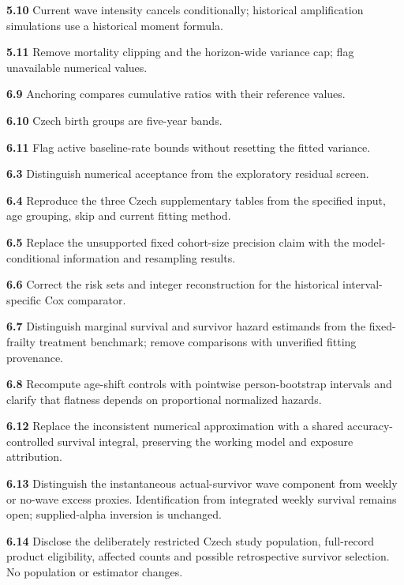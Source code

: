 \documentclass[
]{article}
\begin{document}
\hypertarget{issue-5.10}{}\textbf{5.10} Current wave intensity cancels conditionally; historical amplification simulations use a historical moment formula.
\par\hypertarget{issue-5.11}{}\textbf{5.11} Remove mortality clipping and the horizon-wide variance cap; flag unavailable numerical values.
\par\hypertarget{issue-6.9}{}\textbf{6.9} Anchoring compares cumulative ratios with their reference values.
\par\hypertarget{issue-6.10}{}\textbf{6.10} Czech birth groups are five-year bands.
\par\hypertarget{issue-6.11}{}\textbf{6.11} Flag active baseline-rate bounds without resetting the fitted variance.
\par\hypertarget{issue-6.3}{}\textbf{6.3} Distinguish numerical acceptance from the exploratory residual screen.
\par\hypertarget{issue-6.4}{}\textbf{6.4} Reproduce the three Czech supplementary tables from the specified input, age grouping, skip and current fitting method.
\par\hypertarget{issue-6.5}{}\textbf{6.5} Replace the unsupported fixed cohort-size precision claim with the model-conditional information and resampling results.
\par\hypertarget{issue-6.6}{}\textbf{6.6} Correct the risk sets and integer reconstruction for the historical interval-specific Cox comparator.
\par\hypertarget{issue-6.7}{}\textbf{6.7} Distinguish marginal survival and survivor hazard estimands from the fixed-frailty treatment benchmark; remove comparisons with unverified fitting provenance.
\par\hypertarget{issue-6.8}{}\textbf{6.8} Recompute age-shift controls with pointwise person-bootstrap intervals and clarify that flatness depends on proportional normalized hazards.
\par\hypertarget{issue-6.12}{}\textbf{6.12} Replace the inconsistent numerical approximation with a shared accuracy-controlled survival integral, preserving the working model and exposure attribution.
\par\hypertarget{issue-6.13}{}\textbf{6.13} Distinguish the instantaneous actual-survivor wave component from weekly or no-wave excess proxies. Identification from integrated weekly survival remains open; supplied-alpha inversion is unchanged.
\par\hypertarget{issue-6.14}{}\textbf{6.14} Disclose the deliberately restricted Czech study population, full-record product eligibility, affected counts and possible retrospective survivor selection. No population or estimator changes.
\end{document}
